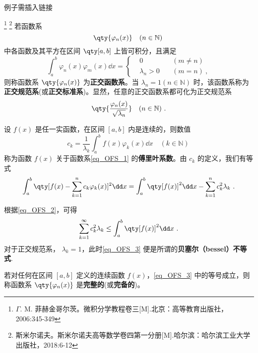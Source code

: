 \begin{issues}
例子需插入链接
\end{issues}

\footnote{$\Gamma$. M. 菲赫金哥尔茨。微积分学教程\;卷三[M].北京：高等教育出版社，2006:345-349}
\footnote{斯米尔诺夫。斯米尔诺夫高等数学卷四第一分册[M].哈尔滨：哈尔滨工业大学出版社，2018:6-12}
若函数系 
\begin{equation}\label{eq_OFS_1}
\qty{\varphi_n(x)}\quad(n\in \mathbb{N})~
\end{equation}
中各函数及其平方在区间 $\qty[a,b]$ 上皆可积分，且满足
\begin{equation}
\int_a^b\varphi_n(x)\varphi_m(x)\dd x=
\left\{
    \begin{aligned}
    &0\quad &(m\neq n)\\
   &\lambda_n>0\quad &(m=n)~,
    \end{aligned}
\right.
\end{equation}
则称函数系 $\qty{\varphi_n(x)}$ 为\textbf{正交函数系}。当 $\lambda_n=1(n\in\mathbb{N})$ 时，该函数系称为\textbf{正交规范系}(或\textbf{正交标准系})。显然，任意的正交函数系都可化为正交规范系 
\begin{equation}
\qty{\frac{\varphi_n(x)}{\sqrt{\lambda_n}}}\quad(n\in \mathbb{N})~.
\end{equation}

设 $f(x)$ 是任一实函数，在区间 $[a,b]$ 内是连续的，则数值
\begin{equation}
c_k=\frac{1}{\lambda_k}\int_a^b f(x)\varphi_k(x)\dd x\quad (k\in \mathbb{N})~
\end{equation}
称为函数 $f(x)$ 关于函数系\autoref{eq_OFS_1} 的\textbf{傅里叶系数}。由 $c_k$ 的定义，我们有等式
\begin{equation}\label{eq_OFS_2}
\int_a^b\qty[f(x)-\sum_{k=1}^nc_k\varphi_k(x)]^2\dd x=\int_a^b\qty[f(x)]^2\dd x-\sum_{k=1}^nc_k^2\lambda_k~.
\end{equation}

根据\autoref{eq_OFS_2}，可得
\begin{equation}\label{eq_OFS_3}
\sum_{k=1}^\infty c_k^2\lambda_k\leq\int_a^b\qty[f(x)]^2\dd x~.
\end{equation}
对于正交规范系， $\lambda_k=1$，此时\autoref{eq_OFS_3} 便是所谓的\textbf{贝塞尔（bessel）不等式}. 

若对任何在区间 $[a,b]$ 定义的连续函数 $f(x)$，\autoref{eq_OFS_3} 中的等号成立，则称函数系 $\qty{\varphi_n(x)}$ 是\textbf{完整的}(或\textbf{完备的})。
